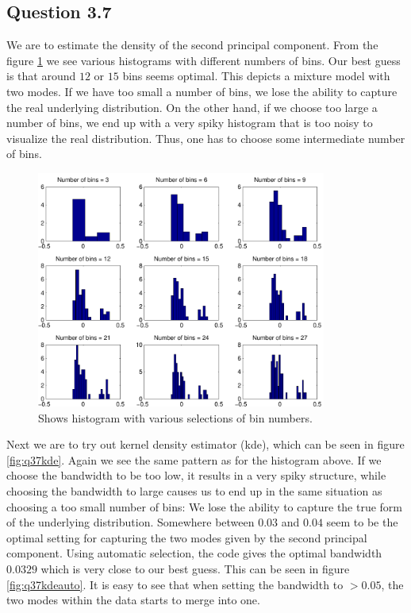 \subsection*{Question 3.7}
We are to estimate the density of the second principal component. From
the figure \ref{fig:q37histograms} we see various histograms with
different numbers of bins. Our best guess is that around $12$ or $15$ bins
seems optimal. This depicts a mixture model with two modes. If we have
too small a number of bins, we lose the ability to capture the real
underlying distribution. On the other hand, if we choose too large a
number of bins, we end up with a very spiky histogram that is too
noisy to visualize the real distribution. Thus, one has to choose some
intermediate number of bins.

\begin{figure}[!htbp]
  \centering
  \includegraphics[width=0.85\textwidth]{./images/q37histograms}
  \caption{Shows histogram with various selections of bin numbers.}
  \label{fig:q37histograms}
\end{figure}

Next we are to try out kernel density estimator (kde), which can be
seen in figure \ref{fig:q37kde}. Again we see the same pattern as for
the histogram above. If we choose the bandwidth to be too low, it
results in a very spiky structure, while choosing the bandwidth to
large causes us to end up in the same situation as choosing a too small number
of bins: We lose the ability to capture the true form of the
underlying distribution. Somewhere between $0.03$ and $0.04$ seem to
be the optimal setting for capturing the two modes given by the second
principal component. Using automatic selection, the code gives the
optimal bandwidth $0.0329$ which is very close to our best guess. This
can be seen in figure \ref{fig:q37kdeauto}. It is easy to see that
when setting the bandwidth to $>0.05$, the two modes within the data
starts to merge into one.

